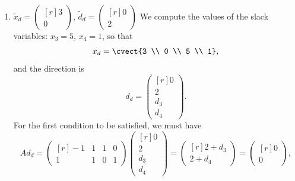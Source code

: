 \begin{enumerate}
\begin{equation*}
        \end{equation*}
        which is verified if $d_3 = -2$ and $d_4 = -2$. Therefore,
        \[
{d}_c = \rvect{0 \\ 2 \\ -2 \\ -2}
\]
satisfies the first condition.
        For the second
        condition, we need to look at the entry 4 of $d_c$, as
        $({x}_c)_4=0$ is the only zero entry of $x_c$. As  $({d}_c)_4 = -2 < 0$, the second condition is not satisfied, and the  direction is not feasible at the given point.
        \vspace{1em}
%
%
        \item $\tilde{x}_d = \begin{pmatrix*}[r] 3 \\ 0 \end{pmatrix*}$, $\tilde{d}_d = \begin{pmatrix*}[r] 0 \\ 2 \end{pmatrix*}$ \vspace{0.5em} \newline
        We compute the values of the slack variables: $x_3 = 5$, $x_4
        = 1$, so that
        \[
         {x}_d = \cvect{3 \\ 0 \\ 5 \\ 1},
         \]
         and the direction is
         \[
{d}_d = \begin{pmatrix*}[r] 0 \\ 2 \\ d_3 \\ d_4 \end{pmatrix*}.
         \]
        For the first condition to be satisfied, we must have
        \begin{equation*}
        A{d}_d = \begin{pmatrix*}[r] -1 & 1 & 1 & 0 \\ 1 & 1 & 0 & 1 \end{pmatrix*} \begin{pmatrix*}[r] 0 \\ 2 \\ d_3 \\ d_4 \end{pmatrix*} = \begin{pmatrix*}[r] 2 + d_3 \\ 2 + d_4 \end{pmatrix*} = \begin{pmatrix*}[r] 0 \\ 0 \end{pmatrix*},

\end{equation*}
\end{enumerate}
